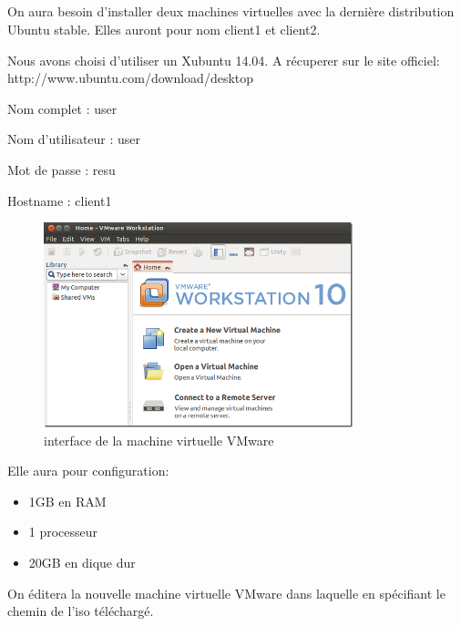 \documentclass[11pt,a4paper,titlepage, oneside]{article}
\begin{document}
\subsection{{\color{blue}{Installation du client ubuntu}}}
\paragraph{}
	        On aura besoin d'installer deux machines virtuelles avec la dernière distribution Ubuntu stable. Elles auront pour nom client1 et client2.

		Nous avons choisi d'utiliser un Xubuntu 14.04. A récuperer sur le site officiel: http://www.ubuntu.com/download/desktop
		
		Nom complet : user
			
		Nom d'utilisateur : user
		
		Mot de passe : resu
		
		Hostname : client1
		
		\begin{figure}[h]
  			\centering
  			\includegraphics[width=0.8\textwidth,natwidth=610,natheight=642]{images/vmwareworkstationubuntu.png}
			\caption{interface de la machine virtuelle VMware}
		\end{figure}
		Elle aura pour configuration:
		\begin{itemize}
                        \item{1GB en RAM}
                        \item{1 processeur}
                        \item{20GB en dique dur}
                \end{itemize}
		On éditera la nouvelle machine virtuelle VMware dans laquelle en spécifiant le chemin de l'iso téléchargé.
		
\end{document}
